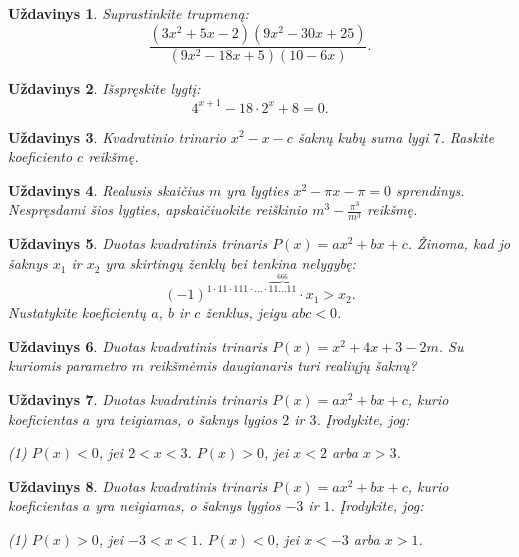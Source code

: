 \documentclass[11pt,a4paper]{scrartcl}
\newtheorem{problem}{Uždavinys}
\begin{document}
\begin{problem}
Suprastinkite trupmeną:
$$ \frac{(3x^2+5x-2)(9x^2-30x+25)}
{(9x^2-18x+5)(10-6x)}. $$
\end{problem}

\begin{problem}
Išspręskite lygtį:
$$ 4^{x+1}-18\cdot2^x+8=0. $$
\end{problem}

\begin{problem}
Kvadratinio trinario $x^2-x-c$ šaknų kubų suma lygi $7$.
Raskite koeficiento $c$ reikšmę.
\end{problem}

\begin{problem}
Realusis skaičius $m$ yra lygties $x^2-\pi x-\pi=0$ sprendinys.
Nespręsdami šios lygties, apskaičiuokite reiškinio
$m^3-\frac{\pi^3}{m^3}$ reikšmę.
\end{problem}


\begin{problem}
    Duotas kvadratinis trinaris $P(x)=ax^2+bx+c$. Žinoma, kad jo šaknys $x_1$ ir $x_2$ yra skirtingų ženklų bei tenkina nelygybę:
    $$(-1) ^{1 \cdot 11 \cdot 111 \cdot \ldots \cdot \overbrace{\scriptstyle 11\ldots 11}^{\scriptstyle 666}} \cdot x_1>x_2.$$
    Nustatykite koeficientų $a$, $b$ ir $c$ ženklus, jeigu $abc<0$.
\end{problem}

\begin{problem}
    Duotas kvadratinis trinaris $P(x)=x^2+4x+3-2m$. Su kuriomis parametro $m$ reikšmėmis daugianaris turi realiųjų šaknų?
\end{problem} 

\begin{problem}
    Duotas kvadratinis trinaris $P(x)=ax^2+bx+c$, kurio koeficientas $a$ yra teigiamas, o šaknys lygios $2$ ir $3$. Įrodykite, jog:
   \begin{tasks}(1)
    \task $P(x)<0$, jei $2<x<3$.   
    \task $P(x)>0$, jei $x<2$ arba $x>3$.
\end{tasks}
\end{problem}

\begin{problem}
    Duotas kvadratinis trinaris $P(x)=ax^2+bx+c$, kurio koeficientas $a$ yra neigiamas, o šaknys lygios $-3$ ir $1$. Įrodykite, jog:
   \begin{tasks}(1)
    \task $P(x)>0$, jei $-3<x<1$.   
    \task $P(x)<0$, jei $x<-3$ arba $x>1$.
\end{tasks}
\end{problem}
\end{document}
